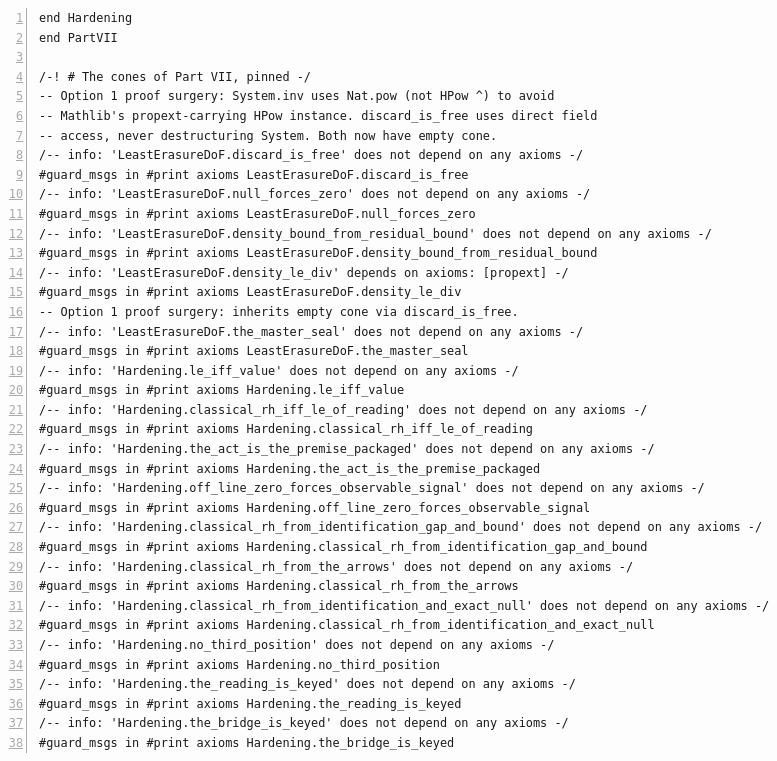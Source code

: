 \documentclass[10pt]{article}
\newcommand{\leansize}{\fontsize{5.5pt}{6.75pt}\selectfont}
\begin{document}
\begin{multicols}{2}
\begin{Verbatim}[numbers=left,firstnumber=1,numbersep=3pt,xleftmargin=2.6em,breaklines=true,breakanywhere=true,breakautoindent=false,breakindent=1.4em,breaksymbolleft={},breakanywheresymbolpre={},fontsize=\leansize]
end Hardening
end PartVII

/-! # The cones of Part VII, pinned -/
-- Option 1 proof surgery: System.inv uses Nat.pow (not HPow ^) to avoid
-- Mathlib's propext-carrying HPow instance. discard_is_free uses direct field
-- access, never destructuring System. Both now have empty cone.
/-- info: 'LeastErasureDoF.discard_is_free' does not depend on any axioms -/
#guard_msgs in #print axioms LeastErasureDoF.discard_is_free
/-- info: 'LeastErasureDoF.null_forces_zero' does not depend on any axioms -/
#guard_msgs in #print axioms LeastErasureDoF.null_forces_zero
/-- info: 'LeastErasureDoF.density_bound_from_residual_bound' does not depend on any axioms -/
#guard_msgs in #print axioms LeastErasureDoF.density_bound_from_residual_bound
/-- info: 'LeastErasureDoF.density_le_div' depends on axioms: [propext] -/
#guard_msgs in #print axioms LeastErasureDoF.density_le_div
-- Option 1 proof surgery: inherits empty cone via discard_is_free.
/-- info: 'LeastErasureDoF.the_master_seal' does not depend on any axioms -/
#guard_msgs in #print axioms LeastErasureDoF.the_master_seal
/-- info: 'Hardening.le_iff_value' does not depend on any axioms -/
#guard_msgs in #print axioms Hardening.le_iff_value
/-- info: 'Hardening.classical_rh_iff_le_of_reading' does not depend on any axioms -/
#guard_msgs in #print axioms Hardening.classical_rh_iff_le_of_reading
/-- info: 'Hardening.the_act_is_the_premise_packaged' does not depend on any axioms -/
#guard_msgs in #print axioms Hardening.the_act_is_the_premise_packaged
/-- info: 'Hardening.off_line_zero_forces_observable_signal' does not depend on any axioms -/
#guard_msgs in #print axioms Hardening.off_line_zero_forces_observable_signal
/-- info: 'Hardening.classical_rh_from_identification_gap_and_bound' does not depend on any axioms -/
#guard_msgs in #print axioms Hardening.classical_rh_from_identification_gap_and_bound
/-- info: 'Hardening.classical_rh_from_the_arrows' does not depend on any axioms -/
#guard_msgs in #print axioms Hardening.classical_rh_from_the_arrows
/-- info: 'Hardening.classical_rh_from_identification_and_exact_null' does not depend on any axioms -/
#guard_msgs in #print axioms Hardening.classical_rh_from_identification_and_exact_null
/-- info: 'Hardening.no_third_position' does not depend on any axioms -/
#guard_msgs in #print axioms Hardening.no_third_position
/-- info: 'Hardening.the_reading_is_keyed' does not depend on any axioms -/
#guard_msgs in #print axioms Hardening.the_reading_is_keyed
/-- info: 'Hardening.the_bridge_is_keyed' does not depend on any axioms -/
#guard_msgs in #print axioms Hardening.the_bridge_is_keyed

\end{Verbatim}
\end{multicols}
\end{document}
